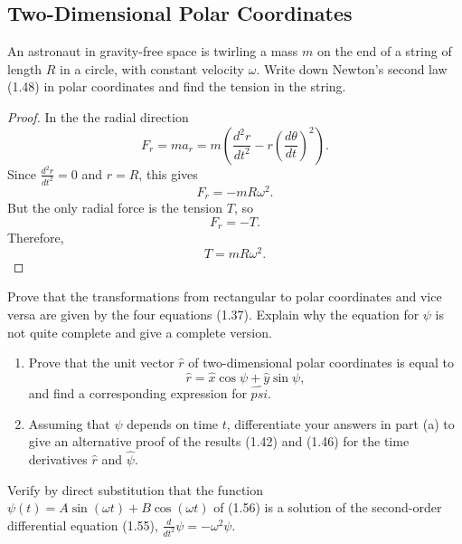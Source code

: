 \subsection{Two-Dimensional Polar Coordinates}

\begin{tcolorbox}[title=Problem 41, breakable]
    An astronaut in gravity-free space is 
    twirling a mass $m$ on the end of a string 
    of length $R$ in a circle, with constant 
    velocity $\omega$. Write down Newton's 
    second law (1.48) in polar coordinates 
    and find the tension in the string.
\end{tcolorbox}

\begin{proof}
    In the the radial direction
    \[F_r = m a_r = m\left(\frac{d^2 r}{dt^2} - r \left(\frac{d\theta}{dt}\right)^2\right).\]
    Since $\frac{d^2 r}{dt^2} = 0$ and $r = R$, this gives
    \[F_r = -mR\omega^2.\]
    But the only radial force is the tension $T$, so
    \[F_r = -T.\]
    Therefore,
    \[T = mR\omega^2.\]
\end{proof}

\begin{tcolorbox}[title=Problem 42, breakable]
    Prove that the transformations from rectangular 
    to polar coordinates and vice versa are given 
    by the four equations (1.37). Explain why the 
    equation for $\psi$ is not quite complete and give 
    a complete version.
\end{tcolorbox}

\begin{tcolorbox}[title=Problem 43, breakable]
    \begin{enumerate}
        \item Prove that the unit vector $\hat{r}$ of two-dimensional 
        polar coordinates is equal to 
        \[\hat{r} = \hat{x} \cos \psi + \hat{y} \sin \psi,\]
        and find a corresponding expression for $\hat{psi}$.
        \item Assuming that $\psi$ depends on time $t$, differentiate 
        your answers in part (a) to give an alternative proof 
        of the results (1.42) and (1.46) for the time 
        derivatives $\hat{r}$ and $\hat{\psi}$.
    \end{enumerate}
\end{tcolorbox}

\begin{tcolorbox}[title=Problem 44, breakable]
    Verify by direct substitution that the function 
    $\psi(t) = A \sin(\omega t) + B \cos(\omega t)$
    of (1.56) is a solution of the second-order differential
    equation (1.55), $\frac{d}{dt^2} \psi = - \omega^2 \psi$.
\end{tcolorbox}

